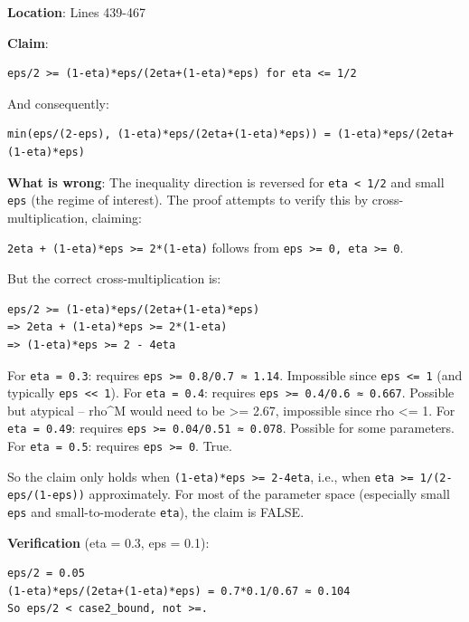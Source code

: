 \documentclass[
  12pt,
]{ctexart}
\begin{document}
\textbf{Location}: Lines 439-467

\textbf{Claim}:

\begin{verbatim}
eps/2 >= (1-eta)*eps/(2eta+(1-eta)*eps) for eta <= 1/2
\end{verbatim}

And consequently:

\begin{verbatim}
min(eps/(2-eps), (1-eta)*eps/(2eta+(1-eta)*eps)) = (1-eta)*eps/(2eta+(1-eta)*eps)
\end{verbatim}

\textbf{What is wrong}: The inequality direction is reversed for
\texttt{eta\ \textless{}\ 1/2} and small \texttt{eps} (the regime of
interest). The proof attempts to verify this by cross-multiplication,
claiming:

\texttt{2eta\ +\ (1-eta)*eps\ \textgreater{}=\ 2*(1-eta)} follows from
\texttt{eps\ \textgreater{}=\ 0,\ eta\ \textgreater{}=\ 0}.

But the correct cross-multiplication is:

\begin{verbatim}
eps/2 >= (1-eta)*eps/(2eta+(1-eta)*eps)
=> 2eta + (1-eta)*eps >= 2*(1-eta)
=> (1-eta)*eps >= 2 - 4eta
\end{verbatim}

For \texttt{eta\ =\ 0.3}: requires
\texttt{eps\ \textgreater{}=\ 0.8/0.7\ ≈\ 1.14}. Impossible since
\texttt{eps\ \textless{}=\ 1} (and typically
\texttt{eps\ \textless{}\textless{}\ 1}). For \texttt{eta\ =\ 0.4}:
requires \texttt{eps\ \textgreater{}=\ 0.4/0.6\ ≈\ 0.667}. Possible but
atypical -- rho\^{}M would need to be \textgreater= 2.67, impossible
since rho \textless= 1. For \texttt{eta\ =\ 0.49}: requires
\texttt{eps\ \textgreater{}=\ 0.04/0.51\ ≈\ 0.078}. Possible for some
parameters. For \texttt{eta\ =\ 0.5}: requires
\texttt{eps\ \textgreater{}=\ 0}. True.

So the claim only holds when
\texttt{(1-eta)*eps\ \textgreater{}=\ 2-4eta}, i.e., when
\texttt{eta\ \textgreater{}=\ 1/(2-eps/(1-eps))} approximately. For most
of the parameter space (especially small \texttt{eps} and
small-to-moderate \texttt{eta}), the claim is FALSE.

\textbf{Verification} (eta = 0.3, eps = 0.1):

\begin{verbatim}
eps/2 = 0.05
(1-eta)*eps/(2eta+(1-eta)*eps) = 0.7*0.1/0.67 ≈ 0.104
So eps/2 < case2_bound, not >=.
\end{verbatim}
\end{document}
